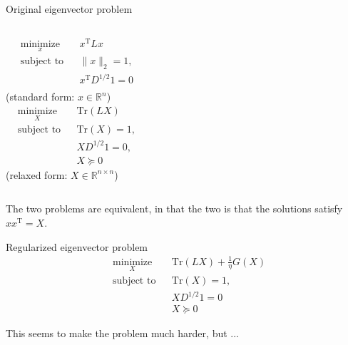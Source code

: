 \documentclass[xcolor=dvipsnames]{beamer}
\begin{document}
\begin{frame}
  \begin{block}{Original eigenvector problem}
  \begin{columns}
    \begin{equation*}
    \begin{aligned}
    & \underset{x}{\text{minimize}}
    & & x^\mathrm{T} L x \\
    & \text{subject to}
    & & \| x \|_2 = 1, \\
    & & & x^\mathrm{T} D^{1/2} 1 = 0 \\
    & & &
    \end{aligned}
    \end{equation*}
    (standard form: $x \in \mathbb{R}^{n}$)
    \begin{equation*}
    \begin{aligned}
    & \underset{X}{\text{minimize}}
    & & \mathrm{Tr}(L X)\\
    & \text{subject to}
    & & \mathrm{Tr}(X) = 1, \\
    & & & X D^{1/2} 1 = 0, \\
    & & & X \succeq 0
    \end{aligned}
    \end{equation*}
    (relaxed form: $X \in \mathbb{R}^{n \times n}$)
  \end{columns}
  \end{block}
  The two problems are equivalent, in that the two is that the solutions
  satisfy $x x^\mathrm{T} = X$.
\end{frame}

\begin{frame}
  \begin{block}{Regularized eigenvector problem}
    \begin{equation*}
    \begin{aligned}
    & \underset{X}{\text{minimize}}
    & & \mathrm{Tr}(L X) + \tfrac{1}{\eta} G(X) \\
    & \text{subject to}
    & & \mathrm{Tr}(X) = 1, \\
    & & & X D^{1/2} 1 = 0 \\
    & & & X \succeq 0
    \end{aligned}
    \end{equation*}
  \end{block}
  This seems to make the problem much harder, but ...
\end{frame}
\end{document}

